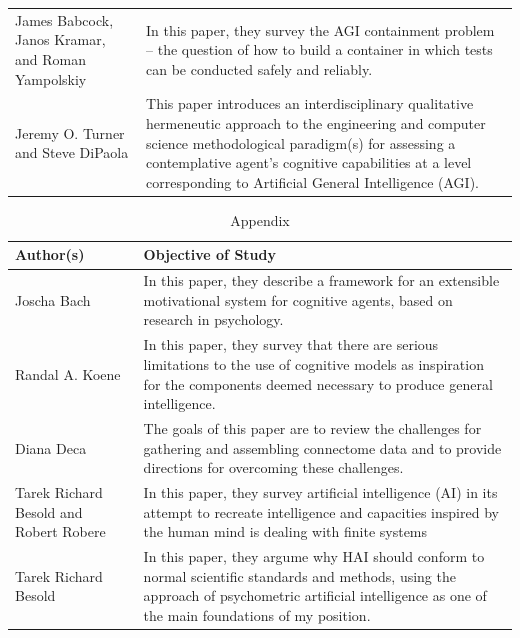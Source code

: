 \documentclass{article}
\begin{document}
\begin{table}
\begin{tabular}{ |p{5cm}|p{10cm}|  }
    James Babcock, Janos Kramar, and Roman Yampolskiy & In this paper, they survey the AGI containment problem – the question of how to build a container in which tests can be conducted safely and reliably. \\

    Jeremy O. Turner and Steve DiPaola & This paper introduces an interdisciplinary qualitative hermeneutic approach to the engineering and computer science methodological paradigm(s) for assessing a contemplative agent’s cognitive capabilities at a level corresponding to Artificial General Intelligence (AGI). \\

     
    \hline
    \end{tabular}
\end{table}

\begin{table}
    \caption{Appendix}
    \centering
    \renewcommand{\arraystretch}{3}
    \begin{tabular}{ |p{5cm}|p{10cm}|  }
    \hline
    Author(s) & Objective of Study\\
    \hline
    
    Joscha Bach & In this paper, they describe a framework for an extensible motivational system for cognitive agents, based on research in psychology.\\

    Randal A. Koene & In this paper, they survey that there are serious limitations to the use of cognitive models as inspiration for the components deemed necessary to produce general intelligence.\\

    Diana Deca & The goals of this paper are to review the challenges for gathering and assembling connectome data and to provide directions for overcoming these challenges. \\

    Tarek Richard Besold and Robert Robere & In this paper, they survey artificial intelligence (AI) in its attempt to recreate intelligence and capacities inspired by the human mind is dealing with finite systems \\

    Tarek Richard Besold & In this paper, they argume why HAI should conform to normal scientific standards and methods, using the approach of psychometric artificial intelligence as one of the main foundations of my position. \\


\end{tabular}
\end{table}
\end{document}
